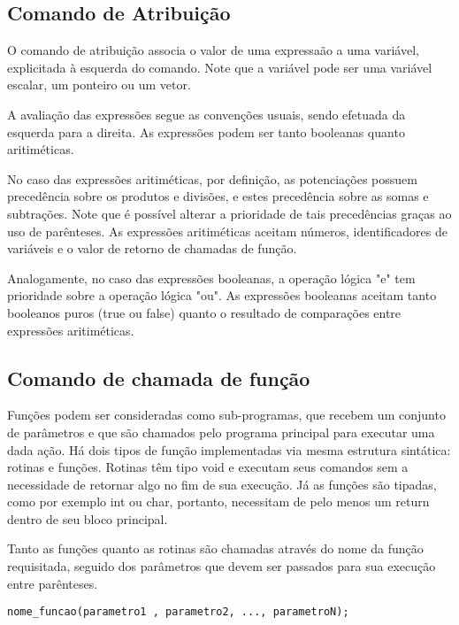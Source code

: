\documentclass[12pt,oneside,a4paper,english]{abntex2}
\begin{document}
  \subsection{Comando de Atribuição}
                             
  O comando de atribuição associa o valor de uma expressaão a uma variável, explicitada à esquerda do comando. Note que a variável pode ser uma variável escalar, um ponteiro ou um vetor. 

  A avaliação das expressões segue as convenções usuais, sendo efetuada da esquerda para a direita. As expressões podem ser tanto booleanas quanto aritiméticas.

  No caso das expressões aritiméticas, por definição, as potenciações possuem precedência sobre os produtos e divisões, e estes precedência sobre as somas e subtrações. Note que é possível alterar a prioridade de tais precedências graças ao uso de parênteses. As expressões aritiméticas aceitam números, identificadores de variáveis e o valor de retorno de chamadas de função.

  Analogamente, no caso das expressões booleanas, a operação lógica "e" tem prioridade sobre a operação lógica "ou". As expressões booleanas aceitam tanto booleanos puros (true ou false) quanto o resultado de comparações entre expressões aritiméticas.

  \subsection{Comando de chamada de função}
                             
  Funções podem ser consideradas como sub-programas, que recebem um conjunto de parâmetros e que são chamados pelo programa principal para executar uma dada ação. Há dois tipos de função implementadas via mesma estrutura sintática: rotinas e funções. Rotinas têm tipo void e executam seus comandos sem a necessidade de retornar algo no fim de sua execução. Já as funções são tipadas, como por exemplo int ou char, portanto, necessitam de pelo menos um return dentro de seu bloco principal.

  Tanto as funções quanto as rotinas são chamadas através do nome da função requisitada, seguido dos parâmetros que devem ser passados para sua execução entre parênteses. 

\begin{lstlisting}
nome_funcao(parametro1 , parametro2, ..., parametroN);
\end{lstlisting}
\end{document}
